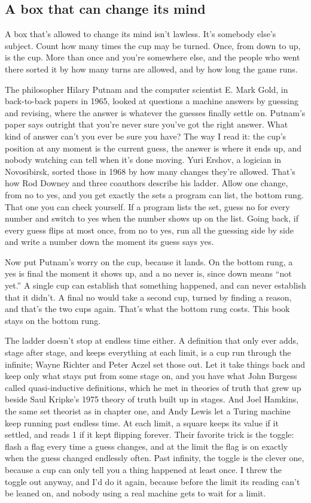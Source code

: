 \documentclass[11pt,twoside]{article}
\theoremstyle{thielethm}
\theoremstyle{thieledef}
\theoremstyle{thieledef}
\theoremstyle{thieledef}
\theoremstyle{thielethm}
\theoremstyle{thieleobs}
\theoremstyle{thielethm}
\begin{document}
\subsection{A box that can change its mind}

A box that's allowed to change its mind isn't lawless. It's somebody else's subject. Count how many times the cup may be turned. Once, from down to up, is the cup. More than once and you're somewhere else, and the people who went there sorted it by how many turns are allowed, and by how long the game runs.

The philosopher Hilary Putnam and the computer scientist E. Mark Gold, in back-to-back papers in 1965, looked at questions a machine answers by guessing and revising, where the answer is whatever the guesses finally settle on. Putnam's paper says outright that you're never sure you've got the right answer. What kind of answer can't you ever be sure you have? The way I read it: the cup's position at any moment is the current guess, the answer is where it ends up, and nobody watching can tell when it's done moving. Yuri Ershov, a logician in Novosibirsk, sorted those in 1968 by how many changes they're allowed. That's how Rod Downey and three coauthors describe his ladder. Allow one change, from no to yes, and you get exactly the sets a program can list, the bottom rung. That one you can check yourself. If a program lists the set, guess no for every number and switch to yes when the number shows up on the list. Going back, if every guess flips at most once, from no to yes, run all the guessing side by side and write a number down the moment its guess says yes.

Now put Putnam's worry on the cup, because it lands. On the bottom rung, a yes is final the moment it shows up, and a no never is, since down means ``not yet.'' A single cup can establish that something happened, and can never establish that it didn't. A final no would take a second cup, turned by finding a reason, and that's the two cups again. That's what the bottom rung costs. This book stays on the bottom rung.

The ladder doesn't stop at endless time either. A definition that only ever adds, stage after stage, and keeps everything at each limit, is a cup run through the infinite; Wayne Richter and Peter Aczel set those out. Let it take things back and keep only what stays put from some stage on, and you have what John Burgess called quasi-inductive definitions, which he met in theories of truth that grew up beside Saul Kripke's 1975 theory of truth built up in stages. And Joel Hamkins, the same set theorist as in chapter one, and Andy Lewis let a Turing machine keep running past endless time. At each limit, a square keeps its value if it settled, and reads 1 if it kept flipping forever. Their favorite trick is the toggle: flash a flag every time a guess changes, and at the limit the flag is on exactly when the guess changed endlessly often. Past infinity, the toggle is the clever one, because a cup can only tell you a thing happened at least once. I threw the toggle out anyway, and I'd do it again, because before the limit its reading can't be leaned on, and nobody using a real machine gets to wait for a limit.
\end{document}

